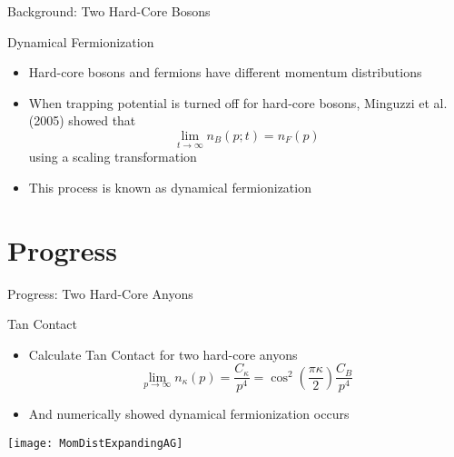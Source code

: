 \documentclass[12pt, usenames, dvipsnames]{beamer}
\begin{document}

\begin{frame}[t]{Background: Two Hard-Core Bosons}
\begin{block}{Dynamical Fermionization}
\begin{itemize}
\item Hard-core bosons and fermions have different momentum distributions
\item When trapping potential is turned off for hard-core bosons, Minguzzi et al. (2005) showed that 
\[ \lim_{t \rightarrow \infty} n_{B}(p; t) = n_{F}(p) \]
using a scaling transformation
\item This process is known as dynamical fermionization

\end{itemize}
\end{block}
\end{frame}

\section{Progress}


\begin{frame}[t]{Progress: Two Hard-Core Anyons}


\begin{block}{Tan Contact}
\begin{itemize}
\item Calculate Tan Contact for two hard-core anyons
\[ \lim_{p \rightarrow \infty} n_{\kappa}(p) = \frac{C_{\kappa}}{p^4} =  \cos^2 \left(\frac{\pi \kappa}{2} \right) \frac{C_{B}}{p^4} \]
\item And numerically showed dynamical fermionization occurs
\end{itemize}


\end{block}

\end{frame}


\begin{frame}

\begin{center}
\texttt{[image: MomDistExpandingAG]}
\end{center}

\end{frame}
\end{document}
